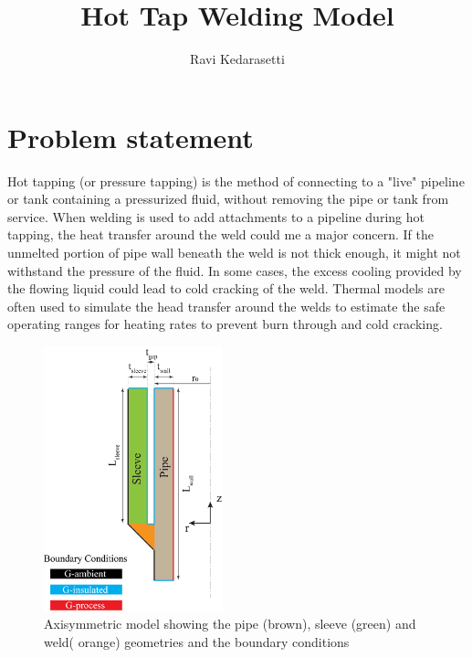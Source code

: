 \documentclass{article}
\title{Hot Tap Welding Model}
\author{Ravi Kedarasetti}
\date{}
\makeatletter
\newcommand{\autocitel}[1]{\autocite{#1}\checknextarg}
\newcommand{\checknextarg}{\@ifnextchar\bgroup{\gobblenextarg}{}}
\newcommand{\gobblenextarg}[1]{$^,$\autocite{#1}\@ifnextchar\bgroup{\gobblenextarg}{}}
\makeatother
\begin{document}
\maketitle

\section{Problem statement}

Hot tapping \autocitel{twi} (or pressure tapping) is the method of connecting to a "live" pipeline or tank containing a pressurized fluid, without removing the pipe or tank from service. When welding is used to add attachments to a pipeline during hot tapping, the heat transfer around the weld could me a major concern. If the unmelted portion of pipe wall beneath the weld is not thick enough, it might not withstand the pressure of the fluid. In some cases, the excess cooling provided by the flowing liquid could lead to cold cracking of the weld. Thermal models are often used to simulate the head transfer around the welds to estimate the safe operating ranges for heating rates to prevent burn through and cold cracking\autocitel{bruce2006comparison}.\\  

\begin{figure}
	\centering
	\includegraphics[width=0.46\textwidth]{problem_statement.png}
	\caption{Axisymmetric model showing the pipe (brown), sleeve (green) and weld( orange) geometries and the boundary conditions}
	\label{fig1}
\end{figure}
\end{document}
